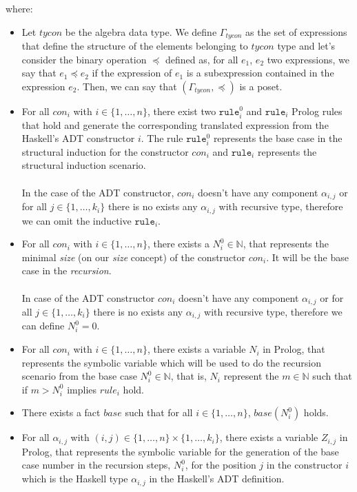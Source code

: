 \documentclass{report}
\theoremstyle{definition}
\theoremstyle{definition}
\newcommand{\ttt}[1]{\texttt{#1}}
\begin{document}
where:
\begin{itemize}
	\item Let $tycon$ be the algebra data type. We define $\Gamma_{tycon}$ as the set of expressions that define the structure of the elements belonging to $tycon$ type and let's consider the binary operation $\preceq$ defined as, for all $e_1$, $e_2$ two expressions, we say that $e_1 \preceq e_2$ if the expression of $e_1$ is a subexpression contained in the expression $e_2$. Then, we can say that $(\Gamma_{tycon}, \preceq)$ is a poset.
	\item For all $con_i$ with $i \in \{1, \ldots, n \}$, there exist two $\ttt{rule}_{i}^{0}$ and $\ttt{rule}_i$ Prolog rules that hold and generate the corresponding translated expression from the Haskell's ADT constructor $i$. The rule $\ttt{rule}_{i}^{0}$ represents the base case in the structural induction for the constructor $con_i$ and $\ttt{rule}_i$ represents the structural induction scenario.\\\\
	      In the case of the ADT constructor, $con_i$ doesn't have any component $\alpha_{i,j}$ or for all $j \in \{1, \ldots, k_i \}$ there is no exists any $\alpha_{i,j}$ with recursive type, therefore we can omit the inductive $\ttt{rule}_i$.
	\item For all $con_i$ with $i \in \{1, \ldots, n \}$, there exists a $N_{i}^{0} \in \mathbb{N}$, that represents the minimal \textit{size} (on our \textit{size} concept) of the constructor $con_i$. It will be the base case in the \textit{recursion}.\\\\
	      In case of the ADT constructor $con_i$ doesn't have any component $\alpha_{i,j}$ or for all $j \in \{1, \ldots, k_i \}$ there is no exists any $\alpha_{i,j}$ with recursive type, therefore we can define $N_{i}^{0} = 0$.
	\item For all $con_i$ with $i \in \{1, \ldots, n \}$, there exists a variable $N_i$ in Prolog, that represents the symbolic variable which will be used to do the recursion scenario from the base case $N_{i}^{0} \in \mathbb{N}$, that is, $N_i$ represent the $m \in \mathbb{N}$ such that if $m > N_{i}^{0}$ implies $rule_i$ hold.
	\item There exists a fact $base$ such that for all $i \in \{1, \ldots, n \}$, $base(N_{i}^{0})$ holds.
	\item For all $\alpha_{i,j}$ with $(i,j) \in \{1, \ldots, n \} \times \{1, \ldots, k_i \}$, there exists a variable $Z_{i,j}$ in Prolog, that represents the symbolic variable for the generation of the base case number in the recursion steps, $N_{i}^{0}$, for the position $j$ in the constructor $i$ which is the Haskell type $\alpha_{i,j}$ in the Haskell's ADT definition.\\\\

\end{itemize}
\end{document}
